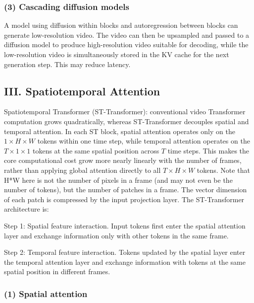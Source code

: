 \hypertarget{cascading-diffusion-models}{%
\subsubsection{(3) Cascading diffusion models}\label{cascading-diffusion-models}}

A model using diffusion within blocks and autoregression between blocks can generate low-resolution video. The video can then be upsampled and passed to a diffusion model to produce high-resolution video suitable for decoding, while the low-resolution video is simultaneously stored in the KV cache for the next generation step. This may reduce latency.

\hypertarget{iii.-spatiotemporal-attention}{%
\subsection{III. Spatiotemporal Attention}\label{iii.-spatiotemporal-attention}}

Spatiotemporal Transformer (ST-Transformer): conventional video Transformer computation grows quadratically, whereas ST-Transformer decouples spatial and temporal attention. In each ST block, spatial attention operates only on the \(1\times H\times W\) tokens within one time step, while temporal attention operates on the \(T\times 1\times 1\) tokens at the same spatial position across \(T\) time steps. This makes the core computational cost grow more nearly linearly with the number of frames, rather than applying global attention directly to all \(T\times H\times W\) tokens.
Note that H*W here is not the number of pixels in a frame (and may not even be the number of tokens), but the number of patches in a frame. The vector dimension of each patch is compressed by the input projection layer. The ST-Transformer architecture is:

Step 1: Spatial feature interaction. Input tokens first enter the spatial attention layer and exchange information only with other tokens in the same frame.

Step 2: Temporal feature interaction. Tokens updated by the spatial layer enter the temporal attention layer and exchange information with tokens at the same spatial position in different frames.

\hypertarget{spatial-attention}{%
\subsubsection{(1) Spatial attention}\label{spatial-attention}}

